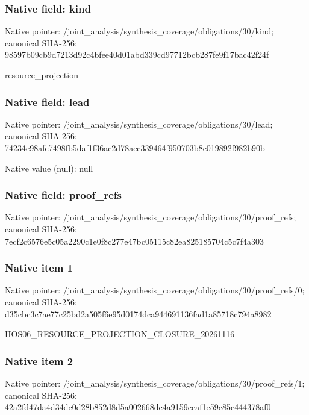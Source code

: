 \documentclass[10pt,a4paper]{article}
\begin{document}
\subsubsection{Native field: kind}
Native pointer: /joint\_\allowbreak{}analysis/synthesis\_\allowbreak{}coverage/obligations/30/kind; canonical SHA-256: 98597b09cb9d7213d92c4bfee40d01abd339cd97712bcb287fe9f17bac42f24f

\begingroup\raggedright\sloppy resource\_\allowbreak{}projection\par\endgroup

\subsubsection{Native field: lead}
Native pointer: /joint\_\allowbreak{}analysis/synthesis\_\allowbreak{}coverage/obligations/30/lead; canonical SHA-256: 74234e98afe7498fb5daf1f36ac2d78acc339464f950703b8c019892f982b90b

Native value (null): null

\subsubsection{Native field: proof\_\allowbreak{}refs}
Native pointer: /joint\_\allowbreak{}analysis/synthesis\_\allowbreak{}coverage/obligations/30/proof\_\allowbreak{}refs; canonical SHA-256: 7ecf2c6576e5c05a2290c1e0f8c277e47bc05115c82ea825185704c5c7f4a303

\subsubsection{Native item 1}
Native pointer: /joint\_\allowbreak{}analysis/synthesis\_\allowbreak{}coverage/obligations/30/proof\_\allowbreak{}refs/0; canonical SHA-256: d35cbc3c7ae77c25bd2a505f6e95d0174dca944691136fad1a85718c794a8982

\begingroup\raggedright\sloppy HOS06\_\allowbreak{}RESOURCE\_\allowbreak{}PROJECTION\_\allowbreak{}CLOSURE\_\allowbreak{}20261116\par\endgroup

\subsubsection{Native item 2}
Native pointer: /joint\_\allowbreak{}analysis/synthesis\_\allowbreak{}coverage/obligations/30/proof\_\allowbreak{}refs/1; canonical SHA-256: 42a2fd47da4d34dc0d28b852d8d5a002668dc4a9159ccaf1e59c85c444378af0
\end{document}
